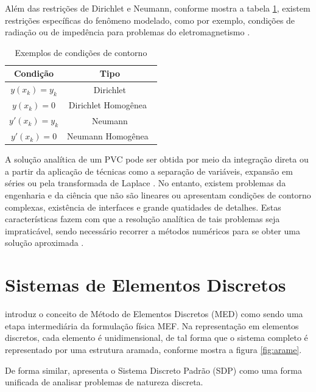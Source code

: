 \documentclass[
    12pt,               %
    openright,          %
    oneside,
    a4paper,            %
    english,            %
    french,             %
    spanish,            %
    brazil              %
    ]{abntex2}
\begin{document}
Além das restrições de Dirichlet e Neumann, conforme mostra a tabela \ref{tab:cond}, existem restrições específicas do fenômeno modelado, como por exemplo, condições de radiação ou de impedência para problemas do eletromagnetismo \cite[p. 20]{jin}. 


\begin{table}   
    \centering
    \begin{tabular}{|c|c|}  
        \hline
        \textbf{Condição} 
        & \textbf{Tipo} \\  
        \hline
        $y(x_k) = y_k $ 
        & Dirichlet \\
        \hline
        $y(x_k) = 0$
        & Dirichlet Homogênea\  \\
        \hline
        $y'(x_k) = y_k$
        & Neumann \\
        \hline
        $y'(x_k) = 0$
        & Neumann Homogênea\  \\
        \hline
    \end{tabular}
    \caption{Exemplos de condições de contorno}
    \label{tab:cond}
\end{table}


A solução analítica de um PVC pode ser obtida por meio da integração direta ou a partir da aplicação de técnicas como a separação de variáveis, expansão em séries ou pela transformada de Laplace \cite[p. 31, 191, 239]{boyceDiprima} \cite[p. 59, 263, 355]{powers}.
No entanto, existem problemas da engenharia e da ciência que não são lineares ou apresentam  condições de contorno complexas, existência de interfaces e grande quatidades de detalhes.  Estas características fazem com que a resolução analítica de tais problemas seja impraticável, sendo necessário recorrer a métodos numéricos para se obter uma solução aproximada \cite[p. 447]{boyceDiprima}  \cite[p.397]{powers}.



\section{Sistemas de Elementos Discretos}
\cite[p. 68]{desai} introduz o conceito de Método de Elementos Discretos (MED) como sendo uma etapa intermediária da formulação física MEF. Na representação em elementos discretos, cada elemento é unidimensional, de tal forma que o sistema completo é representado por uma estrutura aramada, conforme mostra a figura \ref{fig:arame}.

De forma similar, \cite[p. 2]{zien} apresenta o Sistema Discreto Padrão (SDP) como uma forma unificada de analisar problemas de natureza discreta.
\end{document}

